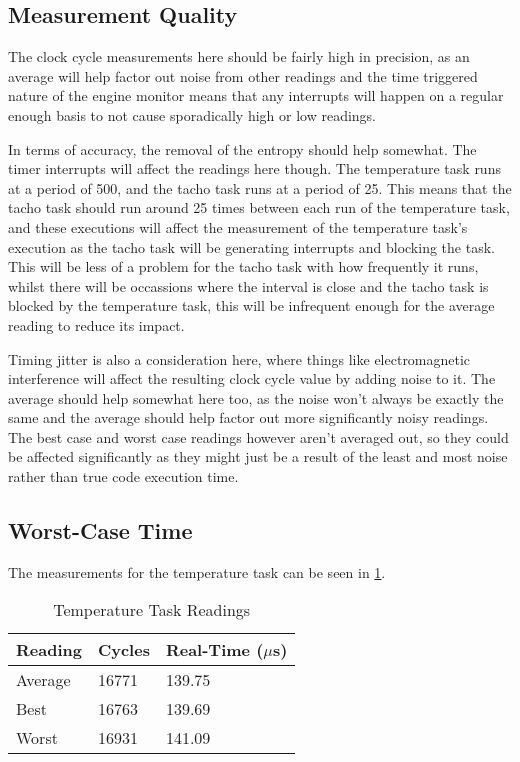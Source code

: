 \documentclass[]{report}
\begin{document}
			\subsection{Measurement Quality}
			The clock cycle measurements here should be fairly high in precision, as an average will help factor out noise from other readings and the time triggered nature of the engine monitor means that any interrupts will happen on a regular enough basis to not cause sporadically high or low readings.
			\medskip
			
			In terms of accuracy, the removal of the entropy should help somewhat. The timer interrupts will affect the readings here though. The temperature task runs at a period of 500, and the tacho task runs at a period of 25. This means that the tacho task should run around 25 times between each run of the temperature task, and these executions will affect the measurement of the temperature task's execution as the tacho task will be generating interrupts and blocking the task. This will be less of a problem for the tacho task with how frequently it runs, whilst there will be occassions where the interval is close and the tacho task is blocked by the temperature task, this will be infrequent enough for the average reading to reduce its impact. 
			
			Timing jitter is also a consideration here, where things like electromagnetic interference will affect the resulting clock cycle value by adding noise to it. The average should help somewhat here too, as the noise won't always be exactly the same and the average should help factor out more significantly noisy readings. The best case and worst case readings however aren't averaged out, so they could be affected significantly as they might just be a result of the least and most noise rather than true code execution time.
			
			\subsection{Worst-Case Time}
			The measurements for the temperature task can be seen in \ref{executionmeasurementstemp}.
			
			\begin{table}[h]
				\centering
				\begin{tabular}{| l | l | l |} 
					\hline
					Reading & Cycles & Real-Time ($\mu $s) \\ [0.5ex] 
					\hline
					Average  & 16771 & 139.75 \\ 
					Best & 16763 & 139.69 \\
					Worst & 16931 & 141.09 \\
					\hline
				\end{tabular}
				\caption{Temperature Task Readings}
				\label{executionmeasurementstemp}
			\end{table}
		
\end{document}
